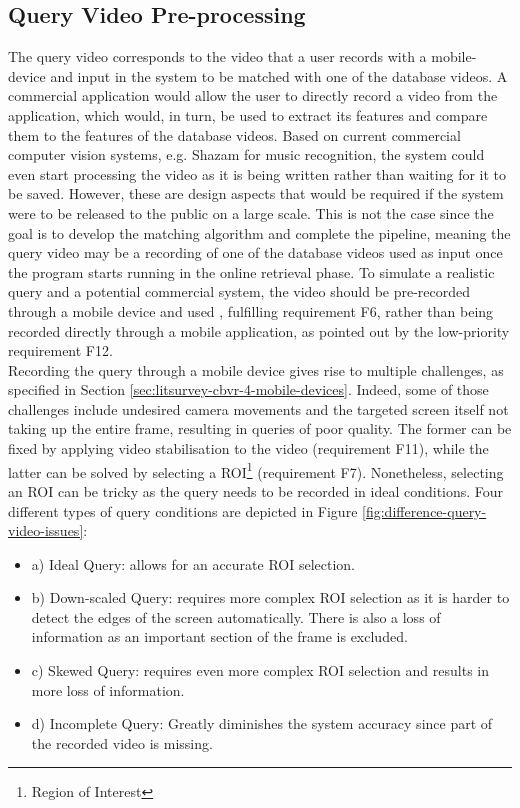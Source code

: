 \subsection{Query Video Pre-processing}

The query video corresponds to the video that a user records with a mobile-device and input in the system to be matched with one of the database videos. A commercial application would allow the user to directly record a video from the application, which would, in turn, be used to extract its features and compare them to the features of the database videos. Based on current commercial computer vision systems, e.g. Shazam for music recognition, the system could even start processing the video as it is being written rather than waiting for it to be saved. However, these are design aspects that would be required if the system were to be released to the public on a large scale. This is not the case since the goal is to develop the matching algorithm and complete the pipeline, meaning the query video may be a recording of one of the database videos used as input once the program starts running in the online retrieval phase. To simulate a realistic query and a potential commercial system, the video should be pre-recorded through a mobile device and used , fulfilling requirement F6, rather than being recorded directly through a mobile application, as pointed out by the low-priority requirement F12.\\

Recording the query through a mobile device gives rise to multiple challenges, as specified in Section \ref{sec:litsurvey-cbvr-4-mobile-devices}. Indeed, some of those challenges include undesired camera movements and the targeted screen itself not taking up the entire frame, resulting in queries of poor quality. The former can be fixed by applying video stabilisation to the video (requirement F11), while the latter can be solved by selecting a ROI\footnote{Region of Interest} (requirement F7). Nonetheless, selecting an ROI can be tricky as the query needs to be recorded in ideal conditions. Four different types of query conditions are depicted in Figure \ref{fig:difference-query-video-issues}:
\begin{itemize}
    \item a) Ideal Query: allows for an accurate ROI selection.
    \item b) Down-scaled Query: requires more complex ROI selection as it is harder to detect the edges of the screen automatically. There is also a loss of information as an important section of the frame is excluded.
    \item c) Skewed Query: requires even more complex ROI selection and results in more loss of information.
    \item d) Incomplete Query: Greatly diminishes the system accuracy since part of the recorded video is missing.
\end{itemize}


